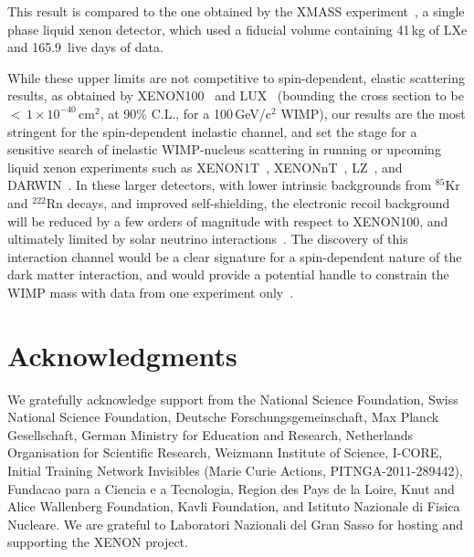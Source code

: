 This result is compared to the one obtained by the XMASS experiment~\cite{Uchida:2014cnn}, a single phase liquid xenon detector, which used a fiducial volume containing 41\,kg of LXe and 165.9~live days of data. 


While these upper limits are not competitive to spin-dependent, elastic scattering results, as obtained by XENON100~\cite{Aprile:2013doa} and LUX~\cite{Akerib:2016lao} 
(bounding the cross section to be $<\,1 \times 10^{-40}$\,cm$^{2}$, at 90\% C.L.,  for a 100\,GeV/c$^2$ WIMP), 
our results are the most stringent for the spin-dependent inelastic channel, and set the stage for a sensitive search of inelastic WIMP-nucleus scattering in running or upcoming liquid xenon experiments such as XENON1T~\cite{Aprile:2015uzo}, XENONnT~\cite{Aprile:2015uzo},  LZ~\cite{Akerib:2015cja}, and DARWIN~\cite{Aalbers:2016jon}. In these larger detectors, with lower intrinsic backgrounds from $^{85}$Kr and $^{222}$Rn decays, and improved self-shielding, the electronic recoil background will be reduced by a few orders of magnitude with respect to XENON100, and ultimately limited by solar neutrino interactions~\cite{Baudis:2013qla}. 
The discovery of this interaction channel would be a clear signature for a spin-dependent nature of the dark matter interaction, and would provide a potential handle  to constrain the WIMP mass with data from one experiment only~\cite{Baudis:2013bba,McCabe:2016aof}.

\section*{Acknowledgments}
We gratefully acknowledge support from the National Science Foundation, Swiss National Science Foundation, Deutsche Forschungsgemeinschaft, Max Planck Gesellschaft, German Ministry for Education and Research, Netherlands Organisation for Scientific Research, Weizmann Institute of Science, I-CORE, Initial Training Network Invisibles (Marie Curie Actions, PITNGA-2011-289442), Fundacao para a Ciencia e a Tecnologia, Region des Pays de la Loire, Knut and Alice Wallenberg Foundation, Kavli Foundation, and Istituto Nazionale di Fisica Nucleare. We are grateful to Laboratori Nazionali del Gran Sasso for hosting and supporting the XENON project.
